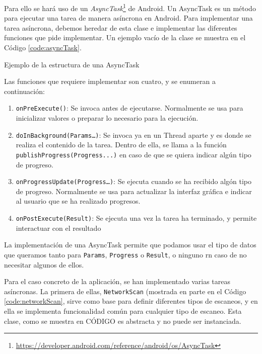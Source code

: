 Para ello se hará uso de un \textit{AsyncTask}\footnote{\url{https://developer.android.com/reference/android/os/AsyncTask}} de Android. Un AsyncTask es un método para ejecutar una tarea de manera asíncrona en Android. Para implementar una tarea asíncrona, debemos heredar de esta clase e implementar las diferentes funciones que pide implementar. Un ejemplo vacío de la clase se muestra en el Código \ref{code:asyncTask}.

\begin{code}
	\caption{Ejemplo de la estructura de una AsyncTask}
	\label{code:asyncTask}
	
\end{code}

Las funciones que requiere implementar son cuatro, y se enumeran a continuación:

\begin{enumerate}
	\item \texttt{onPreExecute()}: Se invoca antes de ejecutarse. Normalmente se usa para inicializar valores o preparar lo necesario para la ejecución.
	\item \texttt{doInBackground(Params…)}: Se invoca ya en un Thread aparte y es donde se realiza el contenido de la tarea. Dentro de ella, se llama a la función \texttt{publishProgress(Progress...)} en caso de que se quiera indicar algún tipo de progreso.
	\item \texttt{onProgressUpdate(Progress…)}: Se ejecuta cuando se ha recibido algón tipo de progreso. Normalmente se usa para actualizar la interfaz gráfica e indicar al usuario que se ha realizado progresos.
	\item \texttt{onPostExecute(Result)}: Se ejecuta una vez la tarea ha terminado, y permite interactuar con el resultado
\end{enumerate}

La implementación de una AsyncTask permite que podamos usar el tipo de datos que queramos tanto para \texttt{Params}, \texttt{Progress} o \texttt{Result}, o ninguno rn caso de no necesitar algunos de ellos.

Para el caso concreto de la aplicación, se han implementado varias tareas asíncronas. La primera de ellas, \texttt{NetworkScan} (mostrada en parte en el Código \ref{code:networkScan}, sirve como base para definir diferentes tipos de escaneos, y en ella se implementa funcionalidad común para cualquier tipo de escaneo. Esta clase, como se muestra en CÓDIGO es abstracta y no puede ser instanciada.


